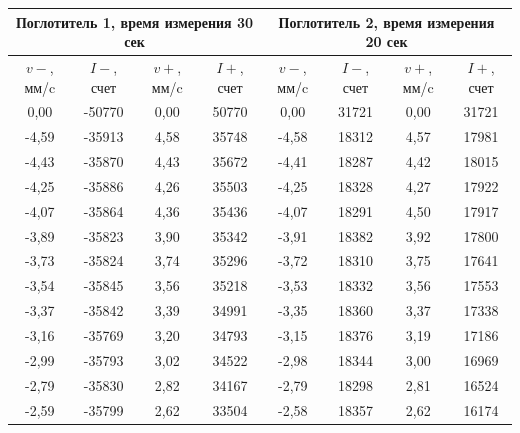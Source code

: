 \documentclass[a4paper, 12pt]{article}
\begin{document}
\begin{table}[h]
\begin{tabular}{|c|c|c|c|c|c|c|c|}
\hline
\multicolumn{4}{|c|}{Поглотитель   1, время измерения 30 сек} & \multicolumn{4}{c|}{Поглотитель   2, время измерения 20 сек} \\ \hline
$v-$, мм/c    & $I-$, счет    & $v+$, мм/c    & $I+$, счет    & $v-$, мм/c    & $I-$, счет    & $v+$, мм/c    & $I+$, счет   \\ \hline
0,00          & -50770        & 0,00          & 50770         & 0,00          & 31721         & 0,00          & 31721        \\ \hline
-4,59         & -35913        & 4,58          & 35748         & -4,58         & 18312         & 4,57          & 17981        \\ \hline
-4,43         & -35870        & 4,43          & 35672         & -4,41         & 18287         & 4,42          & 18015        \\ \hline
-4,25         & -35886        & 4,26          & 35503         & -4,25         & 18328         & 4,27          & 17922        \\ \hline
-4,07         & -35864        & 4,36          & 35436         & -4,07         & 18291         & 4,50          & 17917        \\ \hline
-3,89         & -35823        & 3,90          & 35342         & -3,91         & 18382         & 3,92          & 17800        \\ \hline
-3,73         & -35824        & 3,74          & 35296         & -3,72         & 18310         & 3,75          & 17641        \\ \hline
-3,54         & -35845        & 3,56          & 35218         & -3,53         & 18332         & 3,56          & 17553        \\ \hline
-3,37         & -35842        & 3,39          & 34991         & -3,35         & 18360         & 3,37          & 17338        \\ \hline
-3,16         & -35769        & 3,20          & 34793         & -3,15         & 18376         & 3,19          & 17186        \\ \hline
-2,99         & -35793        & 3,02          & 34522         & -2,98         & 18344         & 3,00          & 16969        \\ \hline
-2,79         & -35830        & 2,82          & 34167         & -2,79         & 18298         & 2,81          & 16524        \\ \hline
-2,59         & -35799        & 2,62          & 33504         & -2,58         & 18357         & 2,62          & 16174        \\ \hline

\end{tabular}
\end{table}
\end{document}
